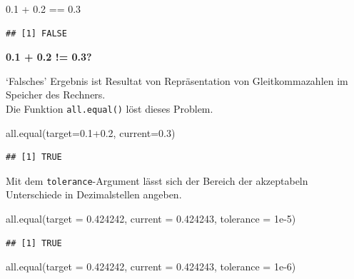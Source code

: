 \documentclass[
]{book}
\newenvironment{Shaded}{\begin{snugshade}}{\end{snugshade}}
\newcommand{\AttributeTok}[1]{\textcolor[rgb]{0.77,0.63,0.00}{#1}}
\newcommand{\FloatTok}[1]{\textcolor[rgb]{0.00,0.00,0.81}{#1}}
\newcommand{\FunctionTok}[1]{\textcolor[rgb]{0.00,0.00,0.00}{#1}}
\newcommand{\NormalTok}[1]{#1}
\newcommand{\SpecialCharTok}[1]{\textcolor[rgb]{0.00,0.00,0.00}{#1}}
\begin{document}
\begin{Shaded}
\begin{Highlighting}[]
\FloatTok{0.1} \SpecialCharTok{+} \FloatTok{0.2} \SpecialCharTok{==} \FloatTok{0.3}
\end{Highlighting}
\end{Shaded}

\begin{verbatim}
## [1] FALSE
\end{verbatim}

\textbf{0.1 + 0.2 != 0.3?}

`Falsches' Ergebnis ist Resultat von Repräsentation von Gleitkommazahlen im Speicher des Rechners.\\
Die Funktion \texttt{all.equal()} löst dieses Problem.

\begin{Shaded}
\begin{Highlighting}[]
\FunctionTok{all.equal}\NormalTok{(}\AttributeTok{target=}\FloatTok{0.1+0.2}\NormalTok{, }\AttributeTok{current=}\FloatTok{0.3}\NormalTok{)}
\end{Highlighting}
\end{Shaded}

\begin{verbatim}
## [1] TRUE
\end{verbatim}

Mit dem \texttt{tolerance}-Argument lässt sich der Bereich der akzeptabeln Unterschiede in Dezimalstellen angeben.

\begin{Shaded}
\begin{Highlighting}[]
\FunctionTok{all.equal}\NormalTok{(}\AttributeTok{target =} \FloatTok{0.424242}\NormalTok{, }\AttributeTok{current =} \FloatTok{0.424243}\NormalTok{,}
          \AttributeTok{tolerance =} \FloatTok{1e{-}5}\NormalTok{)}
\end{Highlighting}
\end{Shaded}

\begin{verbatim}
## [1] TRUE
\end{verbatim}

\begin{Shaded}
\begin{Highlighting}[]
\FunctionTok{all.equal}\NormalTok{(}\AttributeTok{target =} \FloatTok{0.424242}\NormalTok{, }\AttributeTok{current =} \FloatTok{0.424243}\NormalTok{,}
          \AttributeTok{tolerance =} \FloatTok{1e{-}6}\NormalTok{)}
\end{Highlighting}
\end{Shaded}
\end{document}
